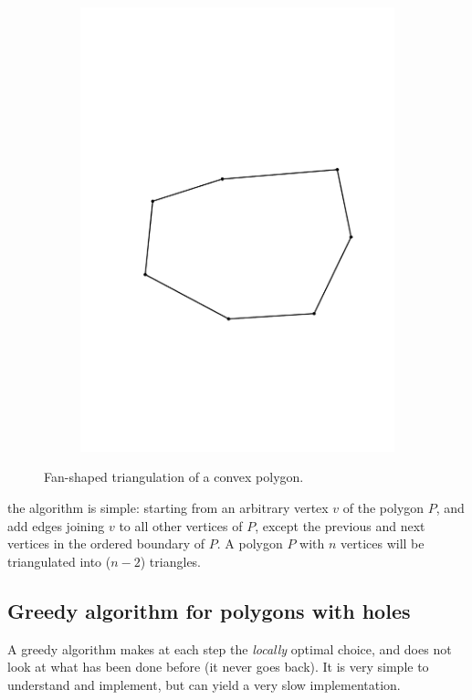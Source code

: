 \begin{figure}
\begin{subfigure}[b]{0.35\linewidth}
    \includegraphics[page=2,width=\textwidth]{figs/fanshaped}
    \caption{}
  \end{subfigure}
\caption{Fan-shaped triangulation of a convex polygon.}
\label{fig:fanshaped}
\end{figure}
the algorithm is simple: starting from an arbitrary vertex $v$ of the polygon $P$, and add edges joining $v$ to all other vertices of $P$, except the previous and next vertices in the ordered boundary of $P$.
A polygon $P$ with $n$ vertices will be triangulated into ($n-2$) triangles.



%
\subsection{Greedy algorithm for polygons with holes}

A greedy algorithm makes at each step the \emph{locally} optimal choice, and does not look at what has been done before (it never goes back). 
It is very simple to understand and implement, but can yield a very slow implementation.

